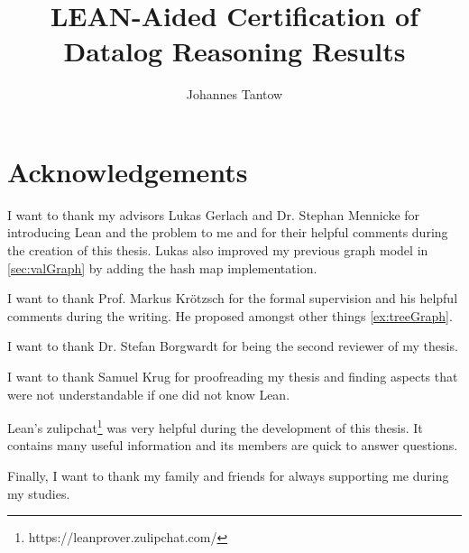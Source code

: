 \documentclass{report}
\title{LEAN-Aided Certification of Datalog Reasoning Results}
\author{Johannes Tantow}
\begin{document}
   
    \tableofcontents

    \chapter*{Acknowledgements}
    I want to thank my advisors Lukas Gerlach and Dr. Stephan Mennicke for introducing Lean and the problem to me and for their helpful comments during the creation of this thesis. Lukas also improved my previous graph model in \cref{sec:valGraph} by adding the hash map implementation.

    I want to thank Prof. Markus Krötzsch for the formal supervision and his helpful comments during the writing. He proposed amongst other things \cref{ex:treeGraph}.

    I want to thank Dr. Stefan Borgwardt for being the second reviewer of my thesis.

    I want to thank Samuel Krug for proofreading my thesis and finding aspects that were not understandable if one did not know Lean.

    Lean's zulipchat\footnote{https://leanprover.zulipchat.com/} was very helpful during the development of this thesis. It contains many useful information and its members are quick to answer questions.

    Finally, I want to thank my family and friends for always supporting me during my studies.

   
    
    

   
    
    

    
    
    
    
    

    
    
    


        

    \newpage
    
    
\end{document}
